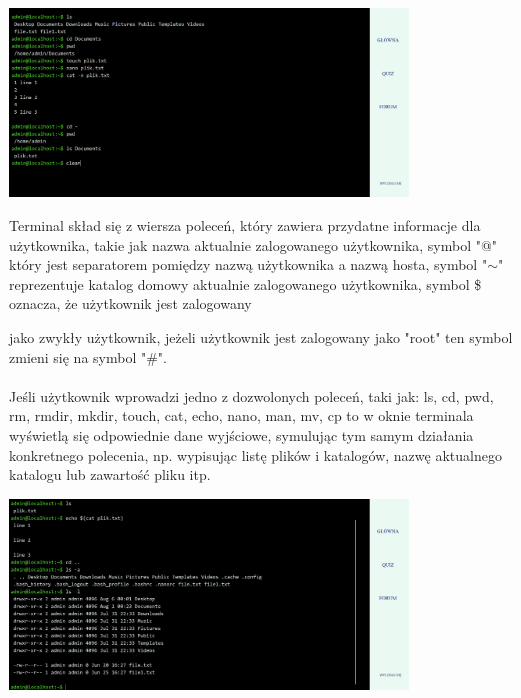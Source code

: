 \documentclass[10pt,a4paper]{report}
\begin{document}
\begin{adjustwidth}{2cm}{2cm}
\begin{minipage}{\linewidth}
\begin{center}
  \includegraphics[width=400px]{project/term1.png}
\end{center}
\end{minipage}
\begin{minipage}{1\linewidth}
\vspace{0.3cm}
 Terminal skład się z wiersza poleceń, który zawiera przydatne informacje dla użytkownika, takie jak nazwa aktualnie zalogowanego użytkownika, symbol "@" który jest separatorem pomiędzy nazwą użytkownika a nazwą hosta, symbol "$\sim$" reprezentuje katalog domowy aktualnie zalogowanego użytkownika, symbol \$ oznacza, że użytkownik jest zalogowany 
  \end{minipage}
  \begin{minipage}{1\linewidth}
 jako zwykły użytkownik, jeżeli użytkownik jest zalogowany jako "root" ten 
 symbol zmieni się na symbol "\#".\\  \\
 Jeśli użytkownik wprowadzi jedno z dozwolonych poleceń, taki jak: ls, cd, pwd, rm, rmdir, mkdir, touch, cat, echo, nano, man, mv, cp to w oknie terminala wyświetlą się odpowiednie dane wyjściowe, symulując tym samym działania konkretnego polecenia, np. wypisując listę plików i katalogów, nazwę aktualnego katalogu lub zawartość pliku itp. \\ 
 \end{minipage}
\begin{minipage}{\linewidth}
\begin{center}
  \includegraphics[width=400px]{project/term2.png}

\end{center}
\end{minipage}
\end{adjustwidth}
\end{document}
